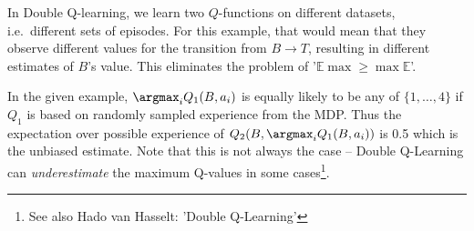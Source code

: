 \documentclass{article}
\begin{document}
In Double Q-learning, we learn two $Q$-functions on different datasets, i.e.\ different sets of episodes. For this example, that would mean that they observe different values for the transition from $B\to T$, resulting in different estimates of $B$'s value. This eliminates the problem of '\(\mathbb{E}\max \geq \max \mathbb{E}\)'.

In the given example, \(\argmax_i Q_1(B, a_i)\) is equally likely to be any of \(\{1, \ldots, 4\}\) if \(Q_1\) is based on randomly sampled experience from the MDP. Thus the expectation over possible experience of \(Q_2(B, \argmax_i Q_1(B, a_i))\) is 0.5 which is the unbiased estimate. Note that this is not always the case -- Double Q-Learning can \emph{underestimate} the maximum Q-values in some cases\footnote{See also {Hado van Hasselt: 'Double Q-Learning'}}.

 
\end{document}
